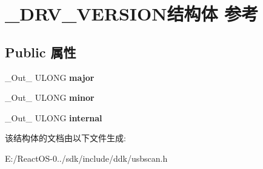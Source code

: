 \hypertarget{struct___d_r_v___v_e_r_s_i_o_n}{}\section{\+\_\+\+D\+R\+V\+\_\+\+V\+E\+R\+S\+I\+O\+N结构体 参考}
\label{struct___d_r_v___v_e_r_s_i_o_n}
\subsection*{Public 属性}
\begin{DoxyCompactItemize}
\item 
\mbox{\label{struct___d_r_v___v_e_r_s_i_o_n_a2367d0920c9e0ce63f951f69369fcb75}} 
\+\_\+\+Out\+\_\+ U\+L\+O\+NG {\bfseries major}
\item 
\mbox{\label{struct___d_r_v___v_e_r_s_i_o_n_aab55f8bcacb1b300ad7007dbef609e5f}} 
\+\_\+\+Out\+\_\+ U\+L\+O\+NG {\bfseries minor}
\item 
\mbox{\label{struct___d_r_v___v_e_r_s_i_o_n_a965e7f9a9c2de5ec74554134d173e44e}} 
\+\_\+\+Out\+\_\+ U\+L\+O\+NG {\bfseries internal}
\end{DoxyCompactItemize}


该结构体的文档由以下文件生成\+:\begin{DoxyCompactItemize}
\item 
E\+:/\+React\+O\+S-\/0../sdk/include/ddk/usbscan.\+h\end{DoxyCompactItemize}

